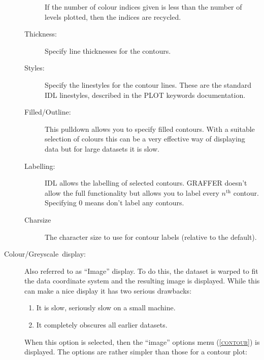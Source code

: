 \documentclass[11pt,twoside,english]{article}
\begin{document}
\begin{description}
\begin{description}
    If the number of colour indices given is less than the number of
    levels plotted, then the indices are recycled.
  \item [Thickness:]Specify line thicknesses for the contours.
  \item [Styles:]Specify the linestyles for the contour lines. These
    are the standard IDL linestyles, described in the PLOT keywords
    documentation.
  \item [Filled/Outline:]This pulldown allows you to specify filled
    contours.  With a suitable selection of colours this can be a very
    effective way of displaying data but for large datasets it is slow.

\item [Labelling:]IDL allows the labelling of selected
  contours. GRAFFER doesn't allow the full functionality but allows you
  to label every $n^{\mathrm{th}}$ contour. Specifying 0 means don't
  label any contours.
\item[Charsize] The character size to use for contour labels (relative
  to the default).
\end{description}
\item [Colour/Greyscale~display:]Also referred to as {}``Image''
  display.  To do this, the dataset is warped to fit the data
  coordinate system and the resulting image is displayed. While this
  can make a nice display it has two serious drawbacks:

  \begin{enumerate}
  \item It is slow, seriously slow on a small machine.
  \item It completely obscures all earlier datasets.
  \end{enumerate}
  When this option is selected, then the {}``image'' options menu
  (\textsc{\autoref{contour}}) is displayed. The options are rather
  simpler than those for a contour plot:


\end{description}
\end{document}
